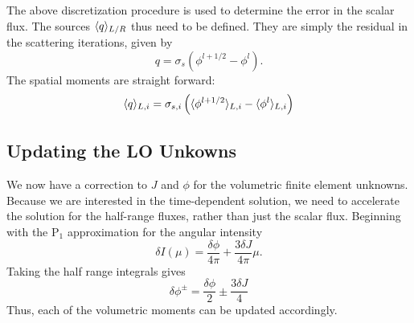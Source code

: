 The above discretization procedure is used to determine the error in the scalar flux.
The sources $\langle q \rangle_{L/R}$ thus need to be defined.  They are simply the residual in
the scattering iterations, given by
\begin{equation}
    q = \sigma_s\left(\phi^{l+1/2} - \phi^{l}\right).
\end{equation}
The spatial moments are straight forward:
\begin{equation}
    \langle q \rangle_{L,i} = \sigma_{s,i}\left(\langle \phi^{l+1/2} \rangle_{L,i} -
    \langle \phi^{l} \rangle_{L,i}\right)
\end{equation}

\subsection{Updating the LO Unkowns}

We now have a correction to $J$ and $\phi$ for the volumetric finite element
unknowns.
Because we are interested in the time-dependent solution, we need to accelerate the solution for the
half-range fluxes, rather than just the scalar flux. Beginning with the P$_1$
approximation for the angular intensity
\begin{equation}
 \delta I(\mu) = \frac{\delta\phi}{4\pi} + \frac{3\delta J}{4\pi} \mu.
\end{equation}
Taking the half range integrals gives
\begin{equation}
    \delta \phi^{\pm} = \frac{\delta \phi}{2} \pm \frac{3 \delta J}{4}
\end{equation}
Thus, each of the volumetric moments can be updated accordingly.








